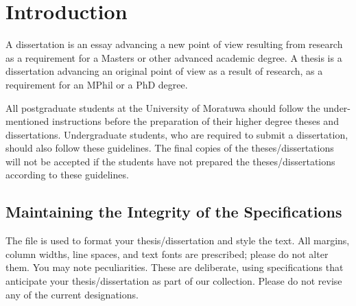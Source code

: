 \documentclass[12pt]{uomthesis}
\begin{document}
\iftables
    \begin{LoT}
    \makeatletter
    \makeatother
    \end{LoT}
\fi

\ifabbrs
    \printacronyms
\fi

\ifappens
    \begin{LoAp}
    \makeatletter
    \makeatother
    \end{LoAp}
\fi

\startContent


\chapter{Introduction}
A dissertation is an essay advancing a new point of view resulting from research as a requirement for a Masters or other advanced academic degree. A thesis is a dissertation advancing an original point of view as a result of research, as a requirement for an MPhil or a PhD degree. 

All postgraduate students at the University of Moratuwa should follow the under-mentioned instructions before the preparation of their higher degree theses and dissertations.
%
Undergraduate students, who are required to submit a dissertation, should also follow these guidelines.
%
The final copies of the theses/dissertations will not be accepted if the students have not prepared the theses/dissertations according to these guidelines.

\section{Maintaining the Integrity of the Specifications}
The \TheClass{} file is used to format your thesis/dissertation and style the text. All margins,  column widths, line spaces, and text fonts are prescribed; please do not alter them. You may note peculiarities. These are deliberate, using specifications that anticipate your thesis/dissertation as part of our collection. Please do not revise any of the current designations.
\end{document}
